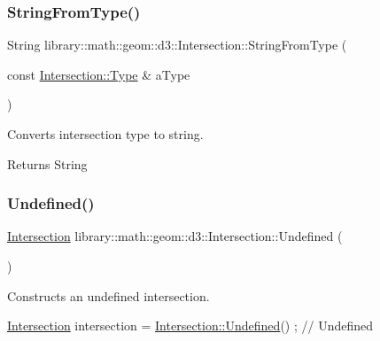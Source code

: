 \subsubsection{\texorpdfstring{String\+From\+Type()}{StringFromType()}}
{\footnotesize\ttfamily String library\+::math\+::geom\+::d3\+::\+Intersection\+::\+String\+From\+Type (\begin{DoxyParamCaption}\item[{const \hyperlink{classlibrary_1_1math_1_1geom_1_1d3_1_1_intersection_a3465d607fd42380f350598e055271b05}{Intersection\+::\+Type} \&}]{a\+Type }\end{DoxyParamCaption})\hspace{0.3cm}{\ttfamily [static]}}



Converts intersection type to string. 

\begin{DoxyReturn}{Returns}
String 
\end{DoxyReturn}
\mbox{\label{classlibrary_1_1math_1_1geom_1_1d3_1_1_intersection_a6ce0af0ff5c24a4b56c264d2d3d6e59b}} 
\subsubsection{\texorpdfstring{Undefined()}{Undefined()}}
{\footnotesize\ttfamily \hyperlink{classlibrary_1_1math_1_1geom_1_1d3_1_1_intersection}{Intersection} library\+::math\+::geom\+::d3\+::\+Intersection\+::\+Undefined (\begin{DoxyParamCaption}{ }\end{DoxyParamCaption})\hspace{0.3cm}{\ttfamily [static]}}



Constructs an undefined intersection. 


\begin{DoxyCode}
\hyperlink{classlibrary_1_1math_1_1geom_1_1d3_1_1_intersection_afbaef540a058ccc7e58f1be2585304a9}{Intersection} intersection = \hyperlink{classlibrary_1_1math_1_1geom_1_1d3_1_1_intersection_a6ce0af0ff5c24a4b56c264d2d3d6e59b}{Intersection::Undefined}() ; \textcolor{comment}{// Undefined}
\end{DoxyCode}


